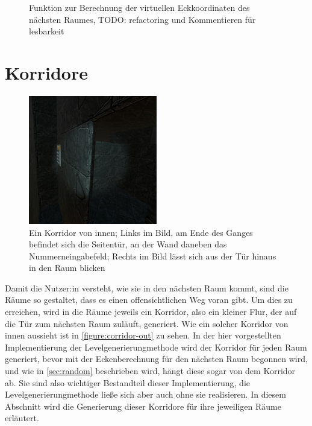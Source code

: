 \begin{figure}[H]%
    \centering
    \caption{Funktion zur Berechnung der virtuellen Eckkoordinaten des nächsten Raumes, TODO:  refactoring und Kommentieren für lesbarkeit}
    \label{figure:calculateNewCornersScript}
\end{figure}

\section{Korridore}
\label{sec:corridor}


\begin{figure}[!h]
    \centering
    \includegraphics[width=0.5\textwidth]{vrscreenshots/korridorheraus.jpg}
    \caption{Ein Korridor von innen; Links im Bild, am Ende des Ganges befindet sich die Seitentür, an der Wand daneben das Nummerneingabefeld; Rechts im Bild lässt sich aus der Tür hinaus in den Raum blicken}\label{figure:corridor-out}
\end{figure}
Damit die Nutzer:in versteht, wie sie in den nächsten Raum kommt, sind die Räume so gestaltet, dass es einen offensichtlichen Weg voran gibt. Um dies zu erreichen, wird in die Räume jeweils ein Korridor, also ein kleiner Flur, der auf die Tür zum nächsten Raum zuläuft, generiert. Wie ein solcher Korridor von innen aussieht ist in \autoref{figure:corridor-out} zu sehen. In der hier vorgestellten Implementierung der Levelgenerierungmethode wird der Korridor für jeden Raum generiert, bevor mit der Eckenberechnung für den nächsten Raum begonnen wird, und wie in \autoref{sec:random} beschrieben wird, hängt diese sogar von dem Korridor ab. Sie sind also wichtiger Bestandteil dieser Implementierung, die Levelgenerierungmethode ließe sich aber auch ohne sie realisieren. In diesem Abschnitt wird die Generierung dieser Korridore für ihre jeweiligen Räume erläutert.

